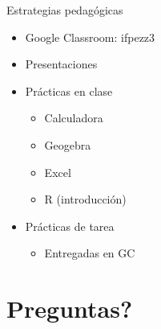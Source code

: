 \documentclass[
  11pt,
  ignorenonframetext,
]{beamer}
\providecommand{\tightlist}{%
  \setlength{\itemsep}{0pt}\setlength{\parskip}{0pt}}
\begin{document}
\begin{frame}{Estrategias pedagógicas}
\protect\hypertarget{estrategias-pedaguxf3gicas}{}
\begin{itemize}
\item
  Google Classroom: ifpezz3
\item
  Presentaciones
\item
  Prácticas en clase

  \begin{itemize}
  \tightlist
  \item
    Calculadora
  \item
    Geogebra
  \item
    Excel
  \item
    R (introducción)
  \end{itemize}
\item
  Prácticas de tarea

  \begin{itemize}
  \tightlist
  \item
    Entregadas en GC
  \end{itemize}
\end{itemize}
\end{frame}

\hypertarget{preguntas}{%
\section{Preguntas?}\label{preguntas}}
\end{document}
